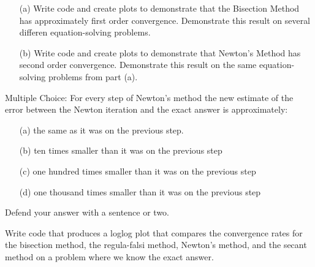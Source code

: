 \begin{problem}
    \begin{enumerate}
        \item[(a)] Write code and create plots to demonstrate that the Bisection Method
            has approximately first order convergence.  Demonstrate this result on several
            differen equation-solving problems.
        \item[(b)] Write code and create plots to demonstrate that Newton's Method has
            second order convergence.  Demonstrate this result on the same
            equation-solving problems from part (a).
    \end{enumerate}
\end{problem}

\begin{problem}
    Multiple Choice: For every step of Newton's method the new estimate of the error
    between the Newton iteration and the exact answer is approximately:
    \begin{enumerate}
        \item[(a)] the same as it was on the previous step.
        \item[(b)] ten times smaller than it was on the previous step
        \item[(c)] one hundred times smaller than it was on the previous step
        \item[(d)] one thousand times smaller than it was on the previous step
    \end{enumerate}
    Defend your answer with a sentence or two.
\end{problem}


\begin{problem}
    Write \ProgLang code that produces a loglog plot that compares the convergence rates for
    the bisection method, the regula-falsi method, Newton's method, and the secant method
    on a problem where we know the exact answer. 
\end{problem}


